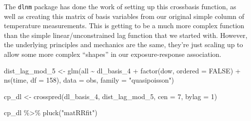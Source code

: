 \documentclass[
]{book}
\newenvironment{Shaded}{\begin{snugshade}}{\end{snugshade}}
\newcommand{\AttributeTok}[1]{\textcolor[rgb]{0.77,0.63,0.00}{#1}}
\newcommand{\ConstantTok}[1]{\textcolor[rgb]{0.00,0.00,0.00}{#1}}
\newcommand{\DecValTok}[1]{\textcolor[rgb]{0.00,0.00,0.81}{#1}}
\newcommand{\FunctionTok}[1]{\textcolor[rgb]{0.00,0.00,0.00}{#1}}
\newcommand{\NormalTok}[1]{#1}
\newcommand{\OtherTok}[1]{\textcolor[rgb]{0.56,0.35,0.01}{#1}}
\newcommand{\SpecialCharTok}[1]{\textcolor[rgb]{0.00,0.00,0.00}{#1}}
\newcommand{\StringTok}[1]{\textcolor[rgb]{0.31,0.60,0.02}{#1}}
\begin{document}
The \texttt{dlnm} package has done
the work of setting up this crossbasis function, as well as creating this matrix of
basis variables from our original simple column of temperature measurements. This
is getting to be a much more complex function than the simple linear/unconstrained lag
function that we started with. However, the underlying principles and mechanics are the
same, they're just scaling up to allow some more complex ``shapes'' in our exposure-response
association.

\begin{Shaded}
\begin{Highlighting}[]
\NormalTok{dist\_lag\_mod\_5 }\OtherTok{\textless{}{-}} \FunctionTok{glm}\NormalTok{(all }\SpecialCharTok{\textasciitilde{}}\NormalTok{ dl\_basis\_4 }\SpecialCharTok{+} 
                        \FunctionTok{factor}\NormalTok{(dow, }\AttributeTok{ordered =} \ConstantTok{FALSE}\NormalTok{) }\SpecialCharTok{+}
                          \FunctionTok{ns}\NormalTok{(time, }\AttributeTok{df =} \DecValTok{158}\NormalTok{), }
                        \AttributeTok{data =}\NormalTok{ obs, }\AttributeTok{family =} \StringTok{"quasipoisson"}\NormalTok{)}

\NormalTok{cp\_dl }\OtherTok{\textless{}{-}} \FunctionTok{crosspred}\NormalTok{(dl\_basis\_4, dist\_lag\_mod\_5, }\AttributeTok{cen =} \DecValTok{7}\NormalTok{, }\AttributeTok{bylag =} \DecValTok{1}\NormalTok{)}

\NormalTok{cp\_dl }\SpecialCharTok{\%\textgreater{}\%} 
  \FunctionTok{pluck}\NormalTok{(}\StringTok{"matRRfit"}\NormalTok{)}
\end{Highlighting}
\end{Shaded}
\end{document}
